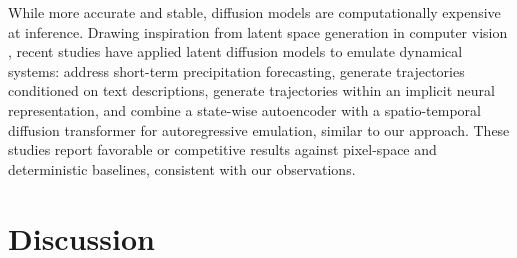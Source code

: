 While more accurate and stable, diffusion models are computationally expensive at inference. Drawing inspiration from latent space generation in computer vision \cite{rombach2022highresolution, peebles2023scalable, esser2024scaling, karras2024analyzing, xie2025sana, chen2025deep, polyak2024movie}, recent studies have applied latent diffusion models to emulate dynamical systems: \textcite{gao2023prediff} address short-term precipitation forecasting, \textcite{zhou2025text2pde} generate trajectories conditioned on text descriptions, \textcite{du2024conditional} generate trajectories within an implicit neural representation, and \textcite{li2025generative} combine a state-wise autoencoder with a spatio-temporal diffusion transformer \cite{peebles2023scalable} for autoregressive emulation, similar to our approach. These studies report favorable or competitive results against pixel-space and deterministic baselines, consistent with our observations.

\section{Discussion} \label{sec:lola-discussion}

